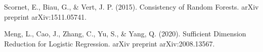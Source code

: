 
\begin{thebibliography}{99}






















	 Scornet, E., Biau, G., \& Vert, J. P. (2015). Consistency of Random Forests. arXiv preprint arXiv:1511.05741.

	 Meng, L., Cao, J., Zhang, C., Yu, S., \& Yang, Q. (2020). Sufficient Dimension Reduction for Logistic Regression. arXiv preprint arXiv:2008.13567.


\end{thebibliography}
